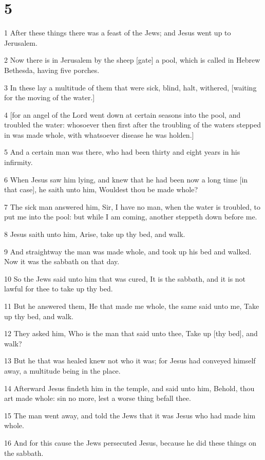 \chapter{5}

\par 1 After these things there was a feast of the Jews; and Jesus went up to Jerusalem.
\par 2 Now there is in Jerusalem by the sheep [gate] a pool, which is called in Hebrew Bethesda, having five porches.
\par 3 In these lay a multitude of them that were sick, blind, halt, withered, [waiting for the moving of the water.]
\par 4 [for an angel of the Lord went down at certain seasons into the pool, and troubled the water: whosoever then first after the troubling of the waters stepped in was made whole, with whatsoever disease he was holden.]
\par 5 And a certain man was there, who had been thirty and eight years in his infirmity.
\par 6 When Jesus saw him lying, and knew that he had been now a long time [in that case], he saith unto him, Wouldest thou be made whole?
\par 7 The sick man answered him, Sir, I have no man, when the water is troubled, to put me into the pool: but while I am coming, another steppeth down before me.
\par 8 Jesus saith unto him, Arise, take up thy bed, and walk.
\par 9 And straightway the man was made whole, and took up his bed and walked. Now it was the sabbath on that day.
\par 10 So the Jews said unto him that was cured, It is the sabbath, and it is not lawful for thee to take up thy bed.
\par 11 But he answered them, He that made me whole, the same said unto me, Take up thy bed, and walk.
\par 12 They asked him, Who is the man that said unto thee, Take up [thy bed], and walk?
\par 13 But he that was healed knew not who it was; for Jesus had conveyed himself away, a multitude being in the place.
\par 14 Afterward Jesus findeth him in the temple, and said unto him, Behold, thou art made whole: sin no more, lest a worse thing befall thee.
\par 15 The man went away, and told the Jews that it was Jesus who had made him whole.
\par 16 And for this cause the Jews persecuted Jesus, because he did these things on the sabbath.
